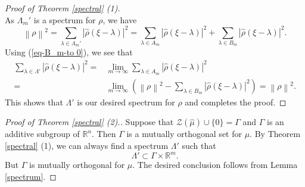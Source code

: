 \documentclass[reqno,a4paper,12pt]{amsart}
\numberwithin{equation}{section}
\newcommand{\R}{{\mathbb R}}
\newcommand{\Norm}[1]{{\left\|{#1}\right\|}}
\newcounter{rem}
\theoremstyle{remark}
\numberwithin{equation}{section}
\def\R{\mathbb{R}}
\begin{document}
\begin{proof}[Proof of Theorem \ref{spectral} (1)]
$$$$
As $\Lambda_m'$ is a spectrum for $\rho$, we have 
$$
\Norm{\rho}^2= \sum_{\lambda\in\Lambda_{m}'} |\widehat{\rho}(\xi-\lambda)|^2 = \sum_{\lambda\in A_m} |\widehat{\rho}(\xi-\lambda)|^2+ \sum_{\lambda\in B_m} |\widehat{\rho}(\xi-\lambda)|^2. 
$$ 
Using (\ref{eq-B_m-to 0}), we see that 
$$
\begin{aligned}
 \sum_{\lambda\in\Lambda'}|\widehat{\rho}(\xi-\lambda)|^2 =&\lim_{m\to\infty} \sum_{\lambda\in A_m} |\widehat{\rho}(\xi-\lambda)|^2\\
 =&\lim_{m\to\infty}\left(\Norm{\rho}^2-\sum_{\lambda\in B_m} |\widehat{\rho}(\xi-\lambda)|^2\right)=\Norm{\rho}^2.
\end{aligned}
$$
This shows that $\Lambda'$ is our desired spectrum for $\rho$ and completes the proof. 
\end{proof}

\begin{proof}[Proof of Theorem \ref{spectral} (2).] Suppose that ${\mathcal Z}(\widehat{\mu})\cup\{0\} = \Gamma$ and $\Gamma$ is an {additive} subgroup of $\R^n$. Then $\Gamma$ is a mutually orthogonal set for $\mu$. By Theorem \ref{spectral} (1), we can always find a spectrum $\Lambda'$ such that 
$$
\Lambda'\subset \Gamma \times \R^m.
$$
But $\Gamma$ is mutually orthogonal for $\mu$. The desired conclusion follows from Lemma \ref{spectrum}.
\end{proof}
\medskip
\end{document}
